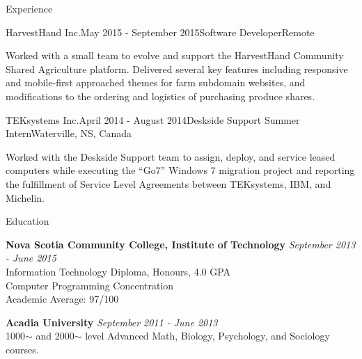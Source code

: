 \documentclass{resume} %
\begin{document}
\begin{rSection}{Experience}
		\begin{rSubsection}{HarvestHand Inc.}{May 2015 - September 2015}{Software Developer}{Remote}
			\item[] Worked with a small team to evolve and support the HarvestHand Community Shared Agriculture platform. Delivered several key features including responsive and mobile-first approached themes for farm subdomain websites, and modifications to the ordering and logistics of purchasing produce shares.
		\end{rSubsection}
		
		\begin{rSubsection}{TEKsystems Inc.}{April 2014 - August 2014}{Deskside Support Summer Intern}{Waterville, NS, Canada}
			\item[] Worked with the Deskside Support team to assign, deploy, and service leased computers while executing the “Go7” Windows 7 migration project and reporting the fulfillment of Service Level Agreements between TEKsystems, IBM, and Michelin.
		\end{rSubsection}
		
	\end{rSection}
	
	
	\begin{rSection}{Education}
		
		{\bf Nova Scotia Community College, Institute of Technology} \hfill {\em September 2013 - June 2015} \\ 
		Information Technology Diploma, Honours, 4.0 GPA \\
		Computer Programming Concentration \\
		Academic Average: 97/100
		
		\vspace{3mm}
		{\bf Acadia University} \hfill {\em September 2011 - June 2013} \\ 
		1000$\sim$ and 2000$\sim$ level Advanced Math, Biology, Psychology, and Sociology courses. \\
		
	\end{rSection}
	
\end{document}
